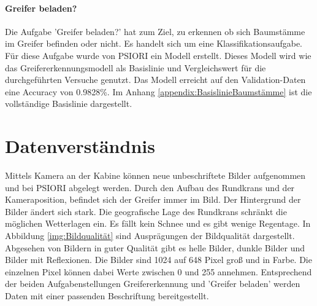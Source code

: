 	\paragraph{Greifer beladen?} Die Aufgabe 'Greifer beladen?' hat zum Ziel, zu erkennen ob sich Baumstämme im Greifer befinden oder nicht. Es handelt sich um eine Klassifikationsaufgabe. Für diese Aufgabe wurde von PSIORI ein Modell erstellt. Dieses Modell wird wie das Greifererkennungsmodell als Basislinie und Vergleichswert für die durchgeführten Versuche genutzt. Das Modell erreicht auf den Validation-Daten eine Accuracy von 0.9828\%. Im Anhang \ref{appendix:BasislinieBaumstämme} ist die vollständige Basislinie dargestellt. 

	\section{Datenverständnis}
	\label{sec:DataUnderstanding}
	Mittels Kamera an der Kabine können neue unbeschriftete Bilder aufgenommen und bei PSIORI abgelegt werden. Durch den Aufbau des Rundkrans und der Kameraposition, befindet sich der Greifer immer im Bild. Der Hintergrund der Bilder ändert sich stark. Die geografische Lage des Rundkrans schränkt die möglichen Wetterlagen ein. Es fällt kein Schnee und es gibt wenige Regentage. In Abbildung  \ref{img:Bildqualität} sind Ausprägungen der Bildqualität dargestellt. Abgesehen von Bildern in guter Qualität gibt es helle Bilder, dunkle Bilder und Bilder mit Reflexionen. Die Bilder sind 1024 auf 648 Pixel groß und in Farbe. Die einzelnen Pixel können dabei Werte zwischen 0 und 255 annehmen. 
	Entsprechend der beiden Aufgabenstellungen Greifererkennung und 'Greifer beladen' werden Daten mit einer passenden Beschriftung bereitgestellt.
	
